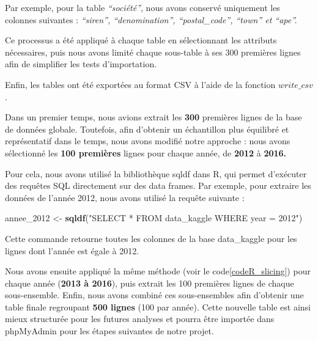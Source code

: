 \documentclass[mstat,12pt]{unswthesis}
\newenvironment{Shaded}{\begin{snugshade}}{\end{snugshade}}
\newcommand{\FunctionTok}[1]{\textcolor[rgb]{0.13,0.29,0.53}{\textbf{#1}}}
\newcommand{\NormalTok}[1]{#1}
\newcommand{\OtherTok}[1]{\textcolor[rgb]{0.56,0.35,0.01}{#1}}
\newcommand{\StringTok}[1]{\textcolor[rgb]{0.31,0.60,0.02}{#1}}
\begin{document}
\medskip

Par exemple, pour la table \emph{``société''}, nous avons conservé
uniquement les colonnes suivantes : \emph{``siren'', ``denomination'',
``postal\_code'', ``town'' et ``ape''.}

Ce processus a été appliqué à chaque table en sélectionnant les
attributs nécessaires, puis nous avons limité chaque sous-table à ses
300 premières lignes afin de simplifier les tests d'importation.

\medskip

Enfin, les tables ont été exportées au format CSV à l'aide de la
fonction \(write\_csv\).

\medskip

Dans un premier temps, nous avions extrait les \textbf{300} premières
lignes de la base de données globale. Toutefois, afin d'obtenir un
échantillon plus équilibré et représentatif dans le temps, nous avons
modifié notre approche : nous avons sélectionné les \textbf{100
premières} lignes pour chaque année, de \textbf{2012} à \textbf{2016.}

\medskip

Pour cela, nous avons utilisé la bibliothèque sqldf dans R, qui permet
d'exécuter des requêtes SQL directement sur des data frames. Par
exemple, pour extraire les données de l'année 2012, nous avons utilisé
la requête suivante :

\begin{Shaded}
\begin{Highlighting}[]
\NormalTok{annee\_2012 }\OtherTok{\textless{}{-}} \FunctionTok{sqldf}\NormalTok{(}\StringTok{"SELECT * FROM data\_kaggle WHERE year = 2012"}\NormalTok{)}
\end{Highlighting}
\end{Shaded}

\medskip

Cette commande retourne toutes les colonnes de la base data\_kaggle pour
les lignes dont l'année est égale à 2012.

\medskip

Nous avons ensuite appliqué la même méthode (voir le
code\ref{codeR_slicing}) pour chaque année (\textbf{2013 à 2016}), puis
extrait les 100 premières lignes de chaque sous-ensemble. Enfin, nous
avons combiné ces sous-ensembles afin d'obtenir une table finale
regroupant \textbf{500 lignes} (100 par année). Cette nouvelle table est
ainsi mieux structurée pour les futures analyses et pourra être importée
dans phpMyAdmin pour les étapes suivantes de notre projet.
\end{document}

